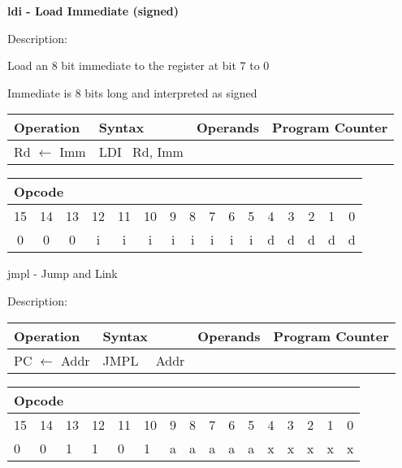 \documentclass{article}
\begin{document}
\textbf{ldi - Load Immediate (signed)}

Description:

Load an 8 bit immediate to the register at bit 7 to 0

Immediate is 8 bits long and interpreted as signed

\begin{tabular}{|l|l|l|l|}
\hline
Operation & Syntax & Operands & Program Counter \\ \hline
Rd $\leftarrow $ Imm & LDI \ Rd, Imm &  &  \\ \hline
\end{tabular}

\begin{tabular}{|c|c|c|c|c|c|c|c|c|c|c|c|c|c|c|c|}
\hline
\multicolumn{6}{|l|}{Opcode} & \multicolumn{5}{|l|}{} & \multicolumn{5}{|l|}{
} \\ \hline
15 & 14 & 13 & 12 & 11 & 10 & 9 & 8 & 7 & 6 & 5 & 4 & 3 & 2 & 1 & 0 \\ \hline
0 & 0 & 0 & i & i & i & i & i & i & i & i & d & d & d & d & d \\ \hline
\end{tabular}

\bigskip

jmpl - Jump and Link

Description:

\begin{tabular}{|l|l|l|l|}
\hline
Operation & Syntax & Operands & Program Counter \\ \hline
PC $\longleftarrow $ Addr & JMPL \ \ Addr &  &  \\ \hline
\end{tabular}

\begin{tabular}{|c|c|c|c|c|c|c|c|c|c|c|c|c|c|c|c|}
\hline
\multicolumn{6}{|l|}{Opcode} & \multicolumn{5}{|l|}{} & \multicolumn{5}{|l|}{
} \\ \hline
15 & 14 & 13 & 12 & 11 & 10 & 9 & 8 & 7 & 6 & 5 & 4 & 3 & 2 & 1 & 0 \\ \hline
\multicolumn{1}{|l|}{0} & \multicolumn{1}{|l|}{0} & \multicolumn{1}{|l|}{1}
& \multicolumn{1}{|l|}{1} & \multicolumn{1}{|l|}{0} & \multicolumn{1}{|l|}{1}
& \multicolumn{1}{|l|}{a} & \multicolumn{1}{|l|}{a} & \multicolumn{1}{|l|}{a}
& \multicolumn{1}{|l|}{a} & \multicolumn{1}{|l|}{a} & \multicolumn{1}{|l|}{x}
& \multicolumn{1}{|l|}{x} & \multicolumn{1}{|l|}{x} & \multicolumn{1}{|l|}{x}
& \multicolumn{1}{|l|}{x} \\ \hline
\end{tabular}
\end{document}
